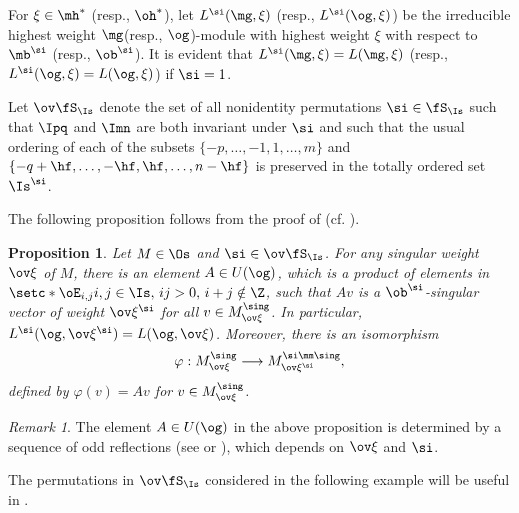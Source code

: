 \documentclass[11pt, reqno]{amsart}
\newtheorem{prop}[thm]{Proposition}
\theoremstyle{definition}
\theoremstyle{remark}
\newtheorem{rem}[thm]{Remark}
\numberwithin{equation}{section}
\begin{document}
For $\xi \in \mh^*$ (resp., $\oh^*$), let $L^\si(\mg, \xi)$ (resp., $L^\si(\og, \xi)$) be the irreducible highest weight $\mg$(resp., $\og$)-module with highest weight $\xi$ with respect to $\mb^{\si}$ (resp., $\ob^\si$).
It is evident that $L^\si(\mg, \xi)=L(\mg, \xi)$ (resp., $L^\si(\og, \xi)=L(\og, \xi)$) if $\si=1$.

Let $\ov \fS_\Is$ denote the set of all nonidentity permutations $\si \in \fS_\Is$ such that $\Ipq$ and $\Imn$ are both invariant under $\si$ and such that the usual ordering of each of the subsets $\{ -p, \ldots, -1,  1, \ldots, m\}$ and $\left\{-q+\hf, \ldots, -\hf, \hf, \ldots, n-\hf \right\}$ is preserved in the totally ordered set $\Is^\si$.

The following proposition follows from the proof of \cite[Lemma 3.2]{CL10} (cf. \cite[Proposition 6.4]{CLW15}).

\begin{prop} \label{Lth}
Let $M\in \Os$ and $\si \in \ov \fS_\Is$. For any singular weight $\ov\xi$ of $M$,  there is an element $A \in U(\og)$, which is a product of elements in $\setc*{ \oE_{i,j} }{ i,j \in \Is, \, ij>0, \, i+j \notin \Z }$, such that $Av$ is a $\ob^\si$-singular vector of weight $\ov\xi^\si$ for all $v\in M_{\ov\xi}^{\sing}$. In particular, $L^\si(\og, \ov\xi^\si)=L(\og, \ov\xi)$.
Moreover, there is an isomorphism
$$
\varphi: M_{\ov\xi}^{\sing} \longrightarrow M_{\ov\xi^\si}^{\si\mm\sing},
$$
defined by $\varphi(v)=Av$ for $v \in M_{\ov\xi}^{\sing}$.
\end{prop}

\begin{rem}
The element $A \in U(\og)$ in the above proposition is determined by a sequence of odd reflections (see \cite[Section 3.1]{CL10} or \cite[Section 6.3]{CW}), which depends on $\ov\xi$ and $\si$.
\end{rem}

The permutations in $\ov\fS_\Is$ considered in the following example will be useful in .
\end{document}
